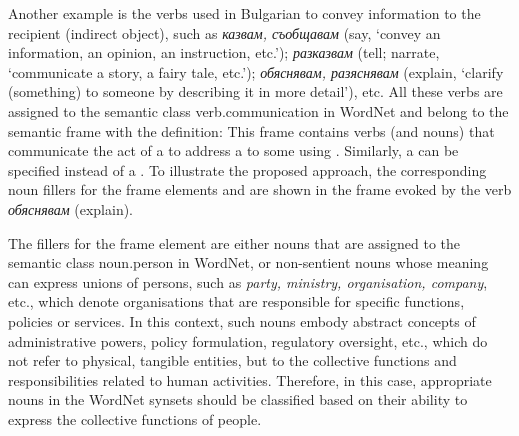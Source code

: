 \documentclass[output=paper,colorlinks,citecolor=brown]{langscibook}
\begin{document}
Another example is the verbs used in Bulgarian to convey information to the recipient (indirect object), such as \textit{казвам, съобщавам} (say, `convey an information, an opinion, an instruction, etc.'); \textit{разказвам} (tell; narrate, `communicate a story, a fairy tale, etc.'); \textit{обяснявам, разяснявам} (explain, `clarify (something) to someone by describing it in more detail'), etc. All these verbs are assigned to the semantic class verb.communication in WordNet and belong to the semantic frame  with the definition: This frame contains verbs (and nouns) that communicate the act of a  to address a  to some  using . Similarly, a  can be specified instead of a .
To illustrate the proposed approach, the corresponding noun fillers for the frame elements  and  are shown in the frame   evoked by the verb \textit{обяснявам} (explain).

The fillers for the frame element  are either nouns that are assigned to the semantic class noun.person in WordNet, or non-sentient nouns whose meaning can express unions of persons, such as \textit{party, ministry, organisation, company}, etc., which denote organisations that are responsible for specific functions, policies or services. In this context, such nouns embody abstract concepts of administrative powers, policy formulation, regulatory oversight, etc., which do not refer to physical, tangible entities, but to the collective functions and responsibilities related to human activities. Therefore, in this case, appropriate nouns in the WordNet synsets should be classified based on their ability to express the collective functions of people.
\end{document}
